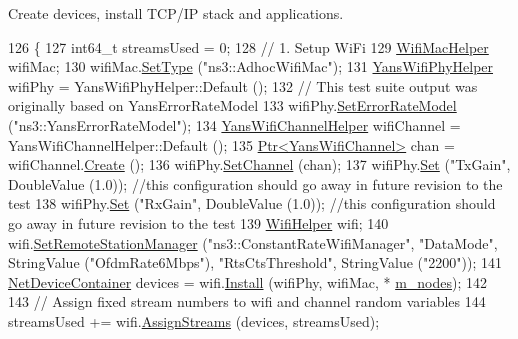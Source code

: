 Create devices, install T\+C\+P/\+IP stack and applications. 


\begin{DoxyCode}
126 \{
127   int64\_t streamsUsed = 0;
128   \textcolor{comment}{// 1. Setup WiFi}
129   \hyperlink{classns3_1_1WifiMacHelper}{WifiMacHelper} wifiMac;
130   wifiMac.\hyperlink{classns3_1_1WifiMacHelper_a382d8df76a1dd7007179d1963b4b6bc6}{SetType} (\textcolor{stringliteral}{"ns3::AdhocWifiMac"});
131   \hyperlink{classns3_1_1YansWifiPhyHelper}{YansWifiPhyHelper} wifiPhy = YansWifiPhyHelper::Default ();
132   \textcolor{comment}{// This test suite output was originally based on YansErrorRateModel}
133   wifiPhy.\hyperlink{classns3_1_1WifiPhyHelper_a219d3ae5881842aa42ea341b985ce114}{SetErrorRateModel} (\textcolor{stringliteral}{"ns3::YansErrorRateModel"});
134   \hyperlink{classns3_1_1YansWifiChannelHelper}{YansWifiChannelHelper} wifiChannel = YansWifiChannelHelper::Default ();
135   \hyperlink{classns3_1_1Ptr}{Ptr<YansWifiChannel>} chan = wifiChannel.\hyperlink{classns3_1_1YansWifiChannelHelper_a0532e292ab9452f3cf630c848708e563}{Create} ();
136   wifiPhy.\hyperlink{classns3_1_1YansWifiPhyHelper_ad2e9a27587dd4ff320435c93cc2676de}{SetChannel} (chan);
137   wifiPhy.\hyperlink{classns3_1_1WifiPhyHelper_a2527d6d7b29f717fd7436166c5f05f1a}{Set} (\textcolor{stringliteral}{"TxGain"}, DoubleValue (1.0)); \textcolor{comment}{//this configuration should go away in future revision to
       the test}
138   wifiPhy.\hyperlink{classns3_1_1WifiPhyHelper_a2527d6d7b29f717fd7436166c5f05f1a}{Set} (\textcolor{stringliteral}{"RxGain"}, DoubleValue (1.0)); \textcolor{comment}{//this configuration should go away in future revision to
       the test}
139   \hyperlink{classns3_1_1WifiHelper}{WifiHelper} wifi;
140   wifi.\hyperlink{classns3_1_1WifiHelper_a3d01b178aeb2de246ab5a3aa5638ce24}{SetRemoteStationManager} (\textcolor{stringliteral}{"ns3::ConstantRateWifiManager"}, \textcolor{stringliteral}{"DataMode"}, 
      StringValue (\textcolor{stringliteral}{"OfdmRate6Mbps"}), \textcolor{stringliteral}{"RtsCtsThreshold"}, StringValue (\textcolor{stringliteral}{"2200"}));
141   \hyperlink{classns3_1_1NetDeviceContainer}{NetDeviceContainer} devices = wifi.\hyperlink{classns3_1_1WifiHelper_a451b3d33fa1497c22f06c5451f57a127}{Install} (wifiPhy, wifiMac, *
      \hyperlink{classBug772ChainTest_a516c0c86192d926b8277fd3ed0e7f112}{m\_nodes}); 
142 
143   \textcolor{comment}{// Assign fixed stream numbers to wifi and channel random variables}
144   streamsUsed += wifi.\hyperlink{classns3_1_1WifiHelper_ab29bf13f8726c2e0807a583bfea79777}{AssignStreams} (devices, streamsUsed);

\end{DoxyCode}
